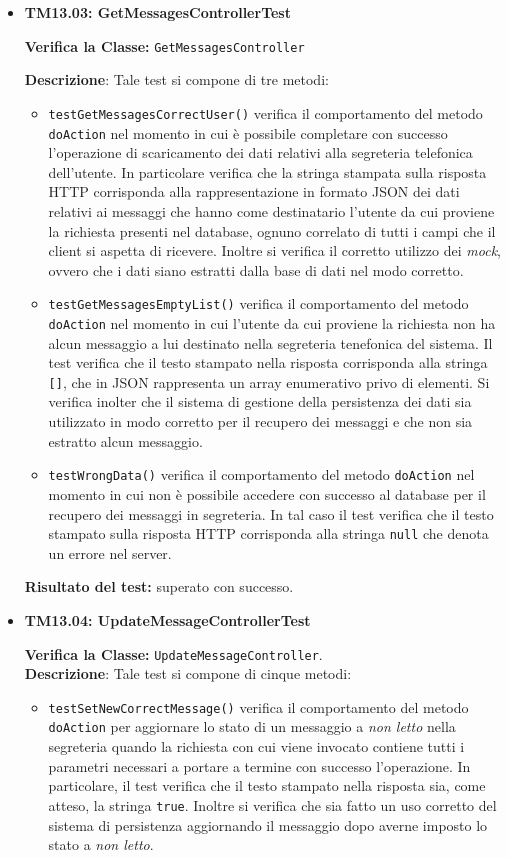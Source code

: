 \begin{itemize}
\item \textbf{TM13.03: GetMessagesControllerTest}

\textbf{Verifica la Classe:} \texttt{GetMessagesController}

\textbf{Descrizione}: %
Tale test si compone di tre metodi:
\begin{itemize}
\item \texttt{testGetMessagesCorrectUser()} verifica il comportamento del metodo \texttt{doAction} nel momento in cui è possibile completare con successo l'operazione di scaricamento dei dati relativi alla segreteria telefonica dell'utente. In particolare verifica che la stringa stampata sulla risposta HTTP corrisponda alla rappresentazione in formato JSON dei dati relativi ai messaggi che hanno come destinatario l'utente da cui proviene la richiesta presenti nel database, ognuno correlato di tutti i campi che il client si aspetta di ricevere. Inoltre si verifica il corretto utilizzo dei \textit{mock}, ovvero che i dati siano estratti dalla base di dati nel modo corretto.

\item \texttt{testGetMessagesEmptyList()} verifica il comportamento del metodo \texttt{doAction} nel momento in cui l'utente da cui proviene la richiesta non ha alcun messaggio a lui destinato nella segreteria tenefonica del sistema. Il test verifica che il testo stampato nella risposta corrisponda alla stringa \texttt{[]}, che in JSON rappresenta un array enumerativo privo di elementi. Si verifica inolter che il sistema di gestione della persistenza dei dati sia utilizzato in modo corretto per il recupero dei messaggi e che non sia estratto alcun messaggio.

\item \texttt{testWrongData()} verifica il comportamento del metodo \texttt{doAction} nel momento in cui non è possibile accedere con successo al database per il recupero dei messaggi in segreteria. In tal caso il test verifica che il testo stampato sulla risposta HTTP corrisponda alla stringa \texttt{null} che denota un errore nel server.
\end{itemize}
\textbf{Risultato del test:} superato con successo.


\item \textbf{TM13.04: UpdateMessageControllerTest} 

\textbf{Verifica la Classe:} \texttt{UpdateMessageController}.\\
\textbf{Descrizione}: %
Tale test si compone di cinque metodi:
\begin{itemize}
\item \texttt{testSetNewCorrectMessage()} verifica il comportamento del metodo \texttt{doAction} per aggiornare lo stato di un messaggio a \textit{non letto} nella segreteria quando la richiesta con cui viene invocato contiene tutti i parametri necessari a portare a termine con successo l'operazione. In particolare, il test verifica che il testo stampato nella risposta sia, come atteso, la stringa \texttt{true}. Inoltre si verifica che sia fatto un uso corretto del sistema di persistenza aggiornando il messaggio dopo averne imposto lo stato a \textit{non letto}.


\end{itemize}
\end{itemize}
